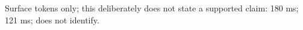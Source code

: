 Surface tokens only; this deliberately does not state a supported claim: 180 ms; 121 ms; does not identify.
